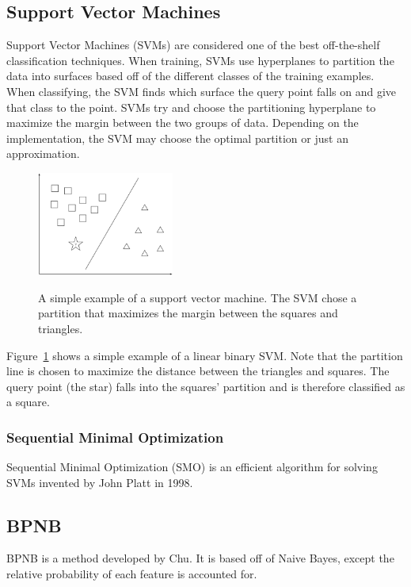 \documentclass[12pt]{ucthesis}
\newcommand{\captionfonts}{\small\bf\ssp}
\begin{document}
\subsection{Support Vector Machines}
\label{background-classification-classifiers-svm}
Support Vector Machines (SVMs) are considered one of the best off-the-shelf classification techniques\cite{Vapnik}.
When training, SVMs use hyperplanes to partition the data into surfaces based off of the different classes of the training examples.
When classifying, the SVM finds which surface the query point falls on and give that class to the point.
SVMs try and choose the partitioning hyperplane to maximize the margin between the two groups of data.
Depending on the implementation, the SVM may choose the optimal partition or just an approximation.

\begin{figure}
   \begin{center}
      \includegraphics[width=0.4\textwidth]{images/SVM.eps}
      \captionfonts
      \caption[Support Vector Machine]{A simple example of a support vector machine. The SVM chose a partition that maximizes the margin between the squares and triangles.}
      \label{fig:svm}
   \end{center}
\end{figure}

Figure~\ref{fig:svm} shows a simple example of a linear binary SVM.
Note that the partition line is chosen to maximize the distance between the triangles and squares.
The query point (the star) falls into the squares' partition and is therefore classified as a square.

\subsubsection{Sequential Minimal Optimization}
\label{background-classification-classifiers-svm-smo}
Sequential Minimal Optimization (SMO) is an efficient algorithm for solving SVMs invented by John Platt in 1998\cite{Platt}.

\subsection{BPNB}
\label{background-classification-classifiers-bpnb}
BPNB is a method developed by Chu\cite{bpnb}.
It is based off of Naive Bayes, except the relative probability of each feature is accounted for.
\end{document}
